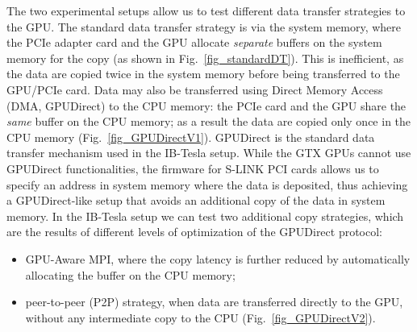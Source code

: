 \documentclass[journal]{IEEEtran}
\begin{document}
The two experimental setups allow us to test different data transfer 
strategies to the GPU. The standard data transfer strategy is via the 
system memory, where the 
PCIe adapter card and the GPU allocate \emph{separate} buffers on the
system memory for the copy (as shown in Fig.~\ref{fig_standardDT}).
This is inefficient, as the data are copied twice in the 
system memory before being transferred to the GPU/PCIe card. 
Data may also be transferred using Direct Memory Access (DMA, 
GPUDirect\cite{bib_GPUDirect}) to the CPU memory:
the PCIe card and the GPU share the \textit{same} buffer on the CPU memory; as 
a result the data are copied only once in the CPU memory 
(Fig.~\ref{fig_GPUDirectV1}). 
GPUDirect is the standard data transfer mechanism used in the IB-Tesla setup. 
While the GTX GPUs cannot use GPUDirect functionalities, the firmware for S-LINK 
PCI cards allows us to specify an address in system memory where the data is deposited, 
thus achieving a GPUDirect-like setup that avoids an additional copy of the data in system memory.
In the IB-Tesla setup we can test two additional copy 
strategies, which are the results of different levels of 
optimization of the GPUDirect protocol:
\begin{itemize}
\item GPU-Aware MPI, where the copy latency is further reduced
by automatically allocating the buffer on the CPU memory;
\item peer-to-peer (P2P) strategy, when data are transferred 
directly to the GPU, without any  
intermediate copy to the CPU (Fig.~\ref{fig_GPUDirectV2}).
\end{itemize}
%
\end{document}
